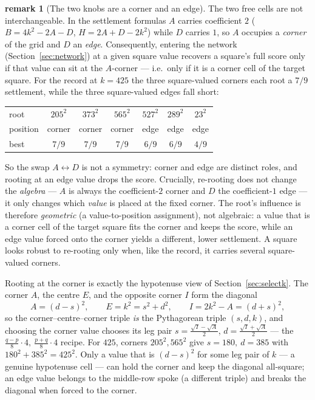 \documentclass[11pt]{article}
\theoremstyle{definition}
\newtheorem{remark}{remark}
\begin{document}
\begin{remark}[The two knobs are a corner and an edge]\label{rem:corneredge}
The two free cells are not interchangeable. In the settlement formulas $A$ carries
coefficient $2$ ($B=4k^2-2A-D$, $H=2A+D-2k^2$) while $D$ carries $1$, so $A$ occupies a
\emph{corner} of the grid and $D$ an \emph{edge}. Consequently, entering the network
(Section~\ref{sec:network}) at a given square value recovers a square's full score only if
that value can sit at the $A$-corner --- i.e.\ only if it is a corner cell of the target
square. For the record at $k=425$ the three square-valued corners each root a $7/9$
settlement, while the three square-valued edges fall short:
\begin{center}\small
\begin{tabular}{lcccccc}
\hline
root     & $205^2$ & $373^2$ & $565^2$ & $527^2$ & $289^2$ & $23^2$\\
position & corner  & corner  & corner  & edge    & edge    & edge\\
best     & $7/9$   & $7/9$   & $7/9$   & $6/9$   & $6/9$   & $4/9$\\
\hline
\end{tabular}
\end{center}
So the swap $A\leftrightarrow D$ is not a symmetry: corner and edge are distinct roles, and
rooting at an edge value drops the score. Crucially, re-rooting does not change the
\emph{algebra} --- $A$ is always the coefficient-$2$ corner and $D$ the coefficient-$1$
edge --- it only changes which \emph{value} is placed at the fixed corner. The root's
influence is therefore \emph{geometric} (a value-to-position assignment), not algebraic: a
value that is a corner cell of the target square fits the corner and keeps the score, while
an edge value forced onto the corner yields a different, lower settlement. A square looks
robust to re-rooting only when, like the record, it carries several square-valued corners.

\medskip\noindent Rooting at the corner is exactly the hypotenuse view of
Section~\ref{sec:selectk}. The corner $A$, the centre $E$, and the opposite corner $I$ form
the diagonal
\[
  A=(d-s)^2,\qquad E=k^2=s^2+d^2,\qquad I=2k^2-A=(d+s)^2,
\]
so the corner--centre--corner triple \emph{is} the Pythagorean triple $(s,d,k)$, and choosing
the corner value chooses its leg pair $s=\tfrac{\sqrt I-\sqrt A}{2}$, $d=\tfrac{\sqrt I+\sqrt A}{2}$
--- the $\tfrac{q-p}{8}\cdot4,\ \tfrac{p+q}{8}\cdot4$ recipe. For $425$, corners $205^2,565^2$
give $s=180,\ d=385$ with $180^2+385^2=425^2$. Only a value that is $(d-s)^2$ for some leg
pair of $k$ --- a genuine hypotenuse cell --- can hold the corner and keep the diagonal
all-square; an edge value belongs to the middle-row spoke (a different triple) and breaks the
diagonal when forced to the corner.
\end{remark}
\end{document}
